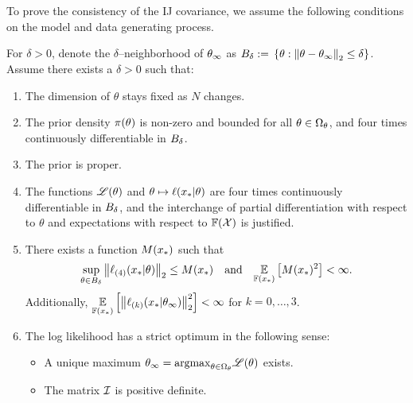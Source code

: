 
To prove the consistency of the IJ covariance,
we assume the following conditions on the model
and data generating process.

\begin{assu}

For $\delta > 0$, denote the $\delta$--neighborhood of
$\theta_{\infty}$ as $B_{\delta} :={}
\left\{\theta: \left\Vert \theta - \theta_{\infty}\right\Vert_2 \le \delta \right\}$.
Assume there exists a $\delta > 0$ such that:

%
\begin{enumerate}
%
\item {} The dimension of $\theta$ stays fixed as $N$ changes.
%
\item {} The prior density $\pi(\theta)$ is non-zero
and bounded for all $\theta \in \Omega_\theta$, and four times continuously
differentiable in $B_{\delta}$.
%
\item {}
The prior is proper.%
%
\item {} The functions $\mathscr{L}(\theta)$ and $\theta \mapsto
\ell(x_{*} \vert \theta)$ are four times continuously differentiable in
$B_{\delta}$, and the interchange of partial differentiation
with respect to $\theta$ and expectations with respect to $\mathbb{F}({\mathcal{X}})$ is
justified.
%
\item {} There exists a function $M(x_{*})$ such that
%
\begin{align*}
%
\sup_{\theta \in \thetaball{\delta}}
\norm{
\ellgrad{4}(\xn \vert \theta)
}_2 \le M(\xn)
\quad\textrm{and}\quad
\expect{\fdist(\xn)}{M(\xn)^2} < \infty.
%
\end{align*}
%
Additionally,
$\underset{\mathbb{F}(x_{*})}{\mathbb{E}}\left[
    \left\Vert \ell_{(k)}(x_{*} \vert \theta_{\infty})\right\Vert_2^2\right] < \infty$ for $k=0, \ldots, 3$.
%
\item {}
The log likelihood has a strict optimum in the following sense:
    \begin{itemize}
    \item
    A unique maximum
    $\theta_{\infty} = \mathrm{argmax}_{\theta \in \Omega_\theta} \mathscr{L}(\theta)$
    exists.
    \item The matrix $\mathcal{I}$ is positive definite.

\end{itemize}
\end{enumerate}
\end{assu}
